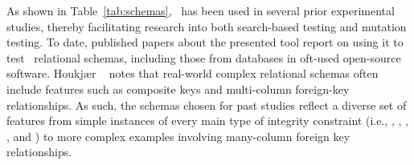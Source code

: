 




As shown in Table~\ref{tab:schemas}, \sa~has been used in several prior experimental studies, thereby facilitating
research into both search-based testing and mutation testing. To date, published papers about the presented tool report
on using it to test \numtestedschemas~relational schemas, including those from databases in oft-used open-source
software. Houkj{\ae}r \etal~\cite{Houkjaer2006} notes that real-world complex relational schemas often include features
such as composite keys and multi-column foreign-key relationships. As such, the schemas chosen for past studies reflect
a diverse set of features from simple instances of every main type of integrity constraint (i.e., \PKCs, \FKCs,
\UCs, \NNCs, and \CCs) to more complex examples involving many-column foreign key relationships.

